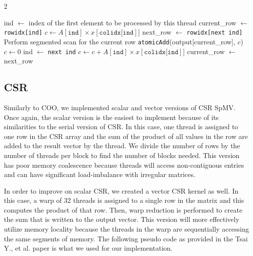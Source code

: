 \documentclass{article}
\begin{document}
\begin{multicols}{2}
\begin{algorithm}[H]
\caption{Load-balancing COO kernel algorithm}
\label{alg:lb-coo}
\begin{algorithmic}[1]
\State ind $\gets$ index of the first element to be processed by this thread
\State current\_row $\gets$ \texttt{rowidx[ind]}
\State $c \gets A[\texttt{ind}] \times x[\texttt{colidx[ind}]]$
    \State next\_row $\gets$ \texttt{rowidx[next ind]}
        \State Perform segmented scan for the current row
            \State \texttt{atomicAdd}(output[current\_row], $c$)
        \EndIf
        \State $c \gets 0$
    \EndIf
    \State ind $\gets$ \texttt{next ind}
    \State $c \gets c + A[\texttt{ind}] \times x[\texttt{colidx[ind}]]$
    \State current\_row $\gets$ next\_row
\EndFor
\end{algorithmic}
\end{algorithm}


\subsection{CSR}

Similarly to COO, we implemented scalar and vector versions of CSR SpMV. Once again, the scalar version is the easiest to implement because of its similarities to the serial version of CSR. In this case, one thread is assigned to one row in the CSR array and the sum of the product of all values in the row are added to the result vector by the thread. We divide the number of rows by the number of threads per block to find the number of blocks needed. This version has poor memory coalescence because threads will access non-contiguous entries and can have significant load-imbalance with irregular matrices.\newline

In order to improve on scalar CSR, we created a vector CSR kernel as well. In this case, a warp of 32 threads is assigned to a single row in the matrix and this computes the product of that row. Then, warp reduction is performed to create the sum that is written to the output vector. This version will more effectively utilize memory locality because the threads in the warp are sequentially accessing the same segments of memory. The following pseudo code as provided in the Tsai Y., et al. paper is what we used for our implementation.\newline


\end{multicols}
\end{document}
